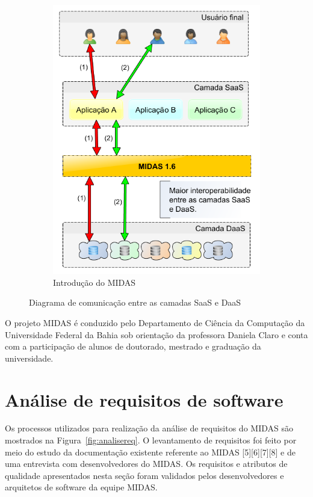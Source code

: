 \documentclass[11pt,a4paper]{article}
\begin{document}
\begin{figure}[!htbp]
\begin{subfigure}[b]{0.4\textwidth}
    \includegraphics[width=\textwidth]{midasproposta}
    \caption{Introdução do MIDAS}
    \label{fig:midasproposta}
  \end{subfigure}
  \caption{Diagrama de comunicação entre as camadas SaaS e DaaS}
\end{figure}

O  projeto MIDAS é conduzido pelo Departamento de Ciência da Computação da Universidade Federal da Bahia sob orientação da professora Daniela Claro e conta com a participação de alunos de doutorado, mestrado e graduação da universidade.

\newpage
\section{Análise de requisitos de software}
\label{sec:analise}
Os processos utilizados para realização da análise de requisitos do MIDAS são mostrados na Figura~\ref{fig:analisereq}. 
O levantamento de requisitos foi feito por meio do estudo da documentação existente referente ao MIDAS [5][6][7][8] e de uma entrevista com desenvolvedores do MIDAS.
Os requisitos e atributos de qualidade apresentados nesta seção foram validados pelos desenvolvedores e arquitetos de software da equipe MIDAS.  
\end{document}
